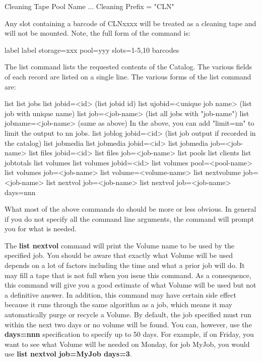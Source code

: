 \begin{description}
\begin{bconfig}{Cleaning Tape}
Pool {
    Name ...
    Cleaning Prefix = "CLN"
}
\end{bconfig}

Any slot containing a barcode of CLNxxxx will be treated as a cleaning tape
and will not be mounted.  Note, the full form of the command is:

\begin{bconsole}{label}
label storage=xxx pool=yyy slots=1-5,10 barcodes
\end{bconsole}

\item [list]
   The list command lists the requested contents of the Catalog.  The
   various fields of each record are listed on a single line.  The various
   forms of the list command are:

\begin{bconsole}{list}
list jobs
list jobid=<id>           (list jobid id)
list ujobid=<unique job name> (list job with unique name)
list job=<job-name>   (list all jobs with "job-name")
list jobname=<job-name>  (same as above)
    In the above, you can add "limit=nn" to limit the output to nn jobs.
list joblog jobid=<id> (list job output if recorded in the catalog)
list jobmedia
list jobmedia jobid=<id>
list jobmedia job=<job-name>
list files jobid=<id>
list files job=<job-name>
list pools
list clients
list jobtotals
list volumes
list volumes jobid=<id>
list volumes pool=<pool-name>
list volumes job=<job-name>
list volume=<volume-name>
list nextvolume job=<job-name>
list nextvol job=<job-name>
list nextvol job=<job-name> days=nnn
\end{bconsole}


   What most of the above commands do should be more or less obvious.  In
   general if you do not specify all the command line arguments, the
   command will prompt you for what is needed.

   The {\bf list nextvol} command will print the Volume name to be used by
   the specified job.  You should be aware that exactly what Volume will be
   used depends on a lot of factors including the time and what a prior job
   will do.  It may fill a tape that is not full when you issue this
   command.  As a consequence, this command will give you a good estimate
   of what Volume will be used but not a definitive answer.  In addition,
   this command may have certain side effect because it runs through the
   same algorithm as a job, which means it may automatically purge or
   recycle a Volume. By default, the job specified must run within the
   next two days or no volume will be found. You can, however, use the
   {\bf days=nnn} specification to specify up to 50 days. For example,
   if on Friday, you want to see what Volume will be needed on Monday,
   for job MyJob, you would use {\bf list nextvol job=MyJob days=3}.


\end{description}

